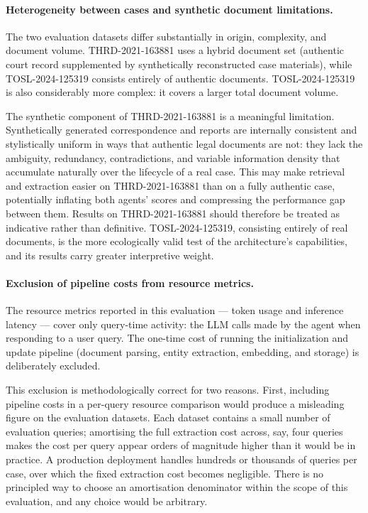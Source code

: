 \paragraph{Heterogeneity between cases and synthetic document limitations.}
The two evaluation datasets differ substantially in origin, complexity, and document volume. THRD-2021-163881 uses a hybrid document set (authentic court record supplemented by synthetically reconstructed case materials), 
while TOSL-2024-125319 consists entirely of authentic documents. TOSL-2024-125319 is also considerably more complex: it covers a larger total document volume.

The synthetic component of THRD-2021-163881 is a meaningful limitation. Synthetically generated correspondence and reports are internally consistent and stylistically uniform in ways that authentic legal documents are not: they lack the ambiguity, redundancy, contradictions, and variable information density that accumulate naturally over the lifecycle of a real case. This may make retrieval and extraction easier on THRD-2021-163881 than on a fully authentic case, potentially inflating both agents' scores and compressing the performance gap between them. Results on THRD-2021-163881 should therefore be treated as indicative rather than definitive. TOSL-2024-125319, consisting entirely of real documents, is the more ecologically valid test of the architecture's capabilities, and its results carry greater interpretive weight.

\paragraph{Exclusion of pipeline costs from resource metrics.}
The resource metrics reported in this evaluation --- token usage and inference latency ---
cover only query-time activity: the LLM calls made by the agent when responding to a
user query. The one-time cost of running the initialization and update pipeline (document
parsing, entity extraction, embedding, and storage) is deliberately excluded.

This exclusion is methodologically correct for two reasons. First, including pipeline
costs in a per-query resource comparison would produce a misleading figure on the
evaluation datasets. Each dataset contains a small number of evaluation queries; amortising
the full extraction cost across, say, four queries makes the cost per query appear orders
of magnitude higher than it would be in practice. A production deployment handles hundreds
or thousands of queries per case, over which the fixed extraction cost becomes negligible.
There is no principled way to choose an amortisation denominator within the scope of this
evaluation, and any choice would be arbitrary.


